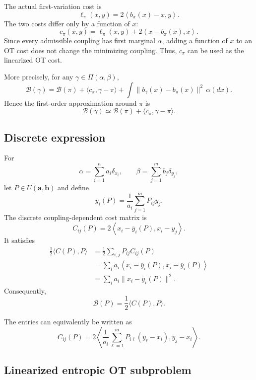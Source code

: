 \documentclass[11pt]{article}
\begin{document}
The actual first-variation cost is
\[
    \ell_\pi(x,y)
    =
    2\left\langle b_\pi(x)-x,y\right\rangle.
\]
The two costs differ only by a function of \(x\):
\[
    c_\pi(x,y)
    =
    \ell_\pi(x,y)
    +
    2\left\langle x-b_\pi(x),x\right\rangle.
\]
Since every admissible coupling has first marginal \(\alpha\), adding a
function of \(x\) to an OT cost does not change the minimizing coupling.
Thus, \(c_\pi\) can be used as the linearized OT cost.

More precisely, for any
\(\gamma\in\Pi(\alpha,\beta)\),
\[
    \mathcal B(\gamma)
    =
    \mathcal B(\pi)
    +
    \langle c_\pi,\gamma-\pi\rangle
    +
    \int
    \|b_\gamma(x)-b_\pi(x)\|^2\,\alpha(dx).
\]
Hence the first-order approximation around \(\pi\) is
\[
    \mathcal B(\gamma)
    \simeq
    \mathcal B(\pi)
    +
    \langle c_\pi,\gamma-\pi\rangle.
\]

\subsection{Discrete expression}

For
\[
    \alpha=\sum_{i=1}^n a_i\delta_{x_i},
    \qquad
    \beta=\sum_{j=1}^m b_j\delta_{y_j},
\]
let \(P\in U(\bm a,\bm b)\) and define
\[
    \overline y_i(P)
    =
    \frac{1}{a_i}\sum_{j=1}^mP_{ij}y_j.
\]
The discrete coupling-dependent cost matrix is
\[
    \boxed{
    C_{ij}(P)
    =
    2\left\langle
        x_i-\overline y_i(P),
        x_i-y_j
    \right\rangle.
    }
\]
It satisfies
\begin{align*}
    \frac12\langle C(P),P\rangle
    &=
    \frac12\sum_{i,j}P_{ij}C_{ij}(P)\\
    &=
    \sum_i a_i
    \left\langle
        x_i-\overline y_i(P),
        x_i-\overline y_i(P)
    \right\rangle\\
    &=
    \sum_i a_i
    \|x_i-\overline y_i(P)\|^2.
\end{align*}
Consequently,
\[
    \boxed{
    \mathcal B(P)
    =
    \frac12\langle C(P),P\rangle.
    }
\]

The entries can equivalently be written as
\[
    C_{ij}(P)
    =
    2
    \left\langle
        \frac1{a_i}\sum_{\ell=1}^m
        P_{i\ell}(y_\ell-x_i),
        y_j-x_i
    \right\rangle.
\]

\subsection{Linearized entropic OT subproblem}
\end{document}
